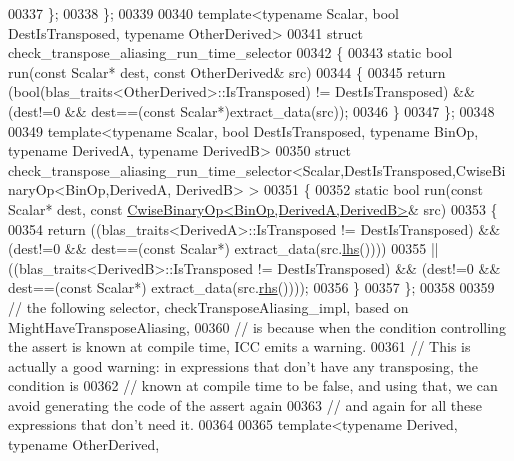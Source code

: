 \begin{DoxyCode}
00337   \};
00338 \};
00339 
00340 \textcolor{keyword}{template}<\textcolor{keyword}{typename} Scalar, \textcolor{keywordtype}{bool} DestIsTransposed, \textcolor{keyword}{typename} OtherDerived>
00341 \textcolor{keyword}{struct }check\_transpose\_aliasing\_run\_time\_selector
00342 \{
00343   \textcolor{keyword}{static} \textcolor{keywordtype}{bool} run(\textcolor{keyword}{const} Scalar* dest, \textcolor{keyword}{const} OtherDerived& src)
00344   \{
00345     \textcolor{keywordflow}{return} (\textcolor{keywordtype}{bool}(blas\_traits<OtherDerived>::IsTransposed) != DestIsTransposed) && (dest!=0 && dest==(\textcolor{keyword}{const} 
      Scalar*)extract\_data(src));
00346   \}
00347 \};
00348 
00349 \textcolor{keyword}{template}<\textcolor{keyword}{typename} Scalar, \textcolor{keywordtype}{bool} DestIsTransposed, \textcolor{keyword}{typename} BinOp, \textcolor{keyword}{typename} DerivedA, \textcolor{keyword}{typename} DerivedB>
00350 \textcolor{keyword}{struct }check\_transpose\_aliasing\_run\_time\_selector<Scalar,DestIsTransposed,CwiseBinaryOp<BinOp,DerivedA,
      DerivedB> >
00351 \{
00352   \textcolor{keyword}{static} \textcolor{keywordtype}{bool} run(\textcolor{keyword}{const} Scalar* dest, \textcolor{keyword}{const} 
      \hyperlink{group___core___module_class_eigen_1_1_cwise_binary_op}{CwiseBinaryOp<BinOp,DerivedA,DerivedB>}& src)
00353   \{
00354     \textcolor{keywordflow}{return} ((blas\_traits<DerivedA>::IsTransposed != DestIsTransposed) && (dest!=0 && dest==(\textcolor{keyword}{const} Scalar*)
      extract\_data(src.\hyperlink{group___core___module_a0f73e7585dfb54d41c1983e1e6a4b269}{lhs}())))
00355         || ((blas\_traits<DerivedB>::IsTransposed != DestIsTransposed) && (dest!=0 && dest==(\textcolor{keyword}{const} Scalar*)
      extract\_data(src.\hyperlink{group___core___module_a3a61cbdf6d1adaa62f012045b04b6d09}{rhs}())));
00356   \}
00357 \};
00358 
00359 \textcolor{comment}{// the following selector, checkTransposeAliasing\_impl, based on MightHaveTransposeAliasing,}
00360 \textcolor{comment}{// is because when the condition controlling the assert is known at compile time, ICC emits a warning.}
00361 \textcolor{comment}{// This is actually a good warning: in expressions that don't have any transposing, the condition is}
00362 \textcolor{comment}{// known at compile time to be false, and using that, we can avoid generating the code of the assert again}
00363 \textcolor{comment}{// and again for all these expressions that don't need it.}
00364 
00365 \textcolor{keyword}{template}<\textcolor{keyword}{typename} Derived, \textcolor{keyword}{typename} OtherDerived,

\end{DoxyCode}
